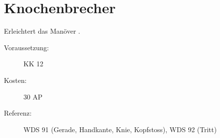 \section{Knochenbrecher}
\label{sf.knochenbrecher}
Erleichtert das Manöver .
\begin{description}
    \item[Voraussetzung:]
        KK 12
    \item [Kosten:]
        30 AP
    \item [Referenz:]
        WDS 91 (Gerade, Handkante, Knie, Kopfstoss), WDS 92 (Tritt)
\end{description}
